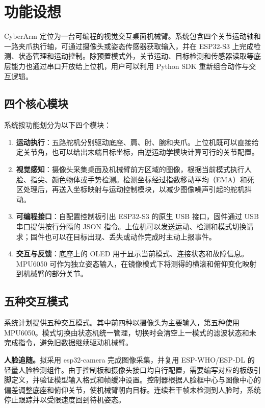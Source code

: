 \section{功能设想}

CyberArm 定位为一台可编程的视觉交互桌面机械臂。系统包含四个关节运动轴和一路夹爪执行轴，可通过摄像头或姿态传感器获取输入，并在 ESP32-S3 上完成检测、状态管理和运动控制。除预置模式外，关节运动、目标检测和传感器读取等底层能力也通过串口开放给上位机，用户可以利用 Python SDK 重新组合动作与交互逻辑。

\subsection{四个核心模块}

系统按功能划分为以下四个模块：

\begin{enumerate}
  \item \textbf{运动执行}：五路舵机分别驱动底座、肩、肘、腕和夹爪。上位机既可以直接给定关节角，也可以给出末端目标坐标，由逆运动学模块计算可行的关节配置。
  \item \textbf{视觉感知}：摄像头采集桌面及机械臂前方区域的图像，根据当前模式执行人脸、指尖、颜色物体或手势检测。检测坐标经过指数移动平均（EMA）和死区处理后，再送入坐标映射与运动控制模块，以减少图像噪声引起的舵机抖动。
  \item \textbf{可编程接口}：自配置控制板引出 ESP32-S3 的原生 USB 接口，固件通过 USB 串口提供按行分隔的 JSON 指令。上位机可以发送运动、检测和模式切换请求；固件也可以在目标出现、丢失或动作完成时主动上报事件。
  \item \textbf{交互与反馈}：底座上的 OLED 用于显示当前模式、连接状态和故障信息。MPU6050 可作为独立姿态输入，在镜像模式下将测得的横滚和俯仰变化映射到机械臂的部分关节。
\end{enumerate}

\subsection{五种交互模式}

系统计划提供五种交互模式。其中前四种以摄像头为主要输入，第五种使用 MPU6050。模式切换由状态机统一管理，切换时会清空上一模式的滤波状态和未完成指令，避免旧数据继续驱动机械臂。

\textbf{人脸追随。}拟采用 esp32-camera 完成图像采集，并复用 ESP-WHO/ESP-DL 的轻量人脸检测组件。由于控制板和摄像头接口均自行配置，需要编写对应的板级引脚定义，并验证模型输入格式和帧缓冲设置。控制器根据人脸框中心与图像中心的偏差调整底座和俯仰关节，使机械臂朝向目标。连续若干帧未检测到人脸时，系统停止跟踪并以受限速度回到待机姿态。

